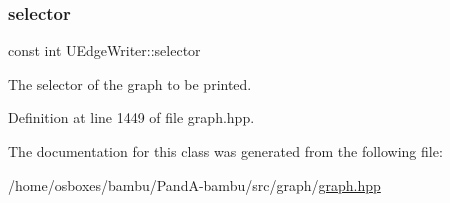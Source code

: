 \mbox{\label{classUEdgeWriter_a7c77dc5d5d0d3a35e892532f052a101c}} 
\subsubsection{\texorpdfstring{selector}{selector}}
{\footnotesize\ttfamily const int U\+Edge\+Writer\+::selector\hspace{0.3cm}{\ttfamily [protected]}}



The selector of the graph to be printed. 



Definition at line 1449 of file graph.\+hpp.



The documentation for this class was generated from the following file\+:\begin{DoxyCompactItemize}
\item 
/home/osboxes/bambu/\+Pand\+A-\/bambu/src/graph/\hyperlink{graph_8hpp}{graph.\+hpp}\end{DoxyCompactItemize}
